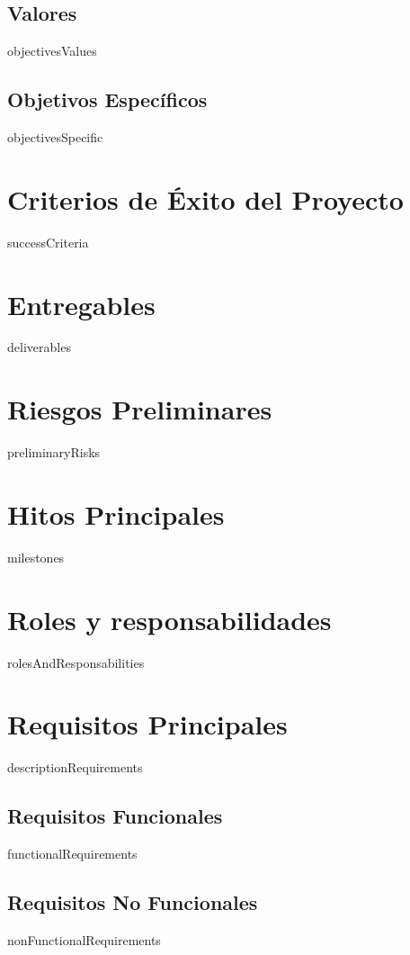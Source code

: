 \documentclass[12pt]{article}
\begin{document}
\subsection{Valores}
{{objectivesValues}}
\subsection{Objetivos Específicos}
{{objectivesSpecific}}

\section{Criterios de Éxito del Proyecto}
{{successCriteria}}

\section{Entregables}
{{deliverables}}

\section{Riesgos Preliminares}
{{preliminaryRisks}}

\section{Hitos Principales}
{{milestones}}

\section{Roles y responsabilidades}
{{rolesAndResponsabilities}}

\section{Requisitos Principales}
{{descriptionRequirements}}
\subsection{Requisitos Funcionales}
{{functionalRequirements}}
\subsection{Requisitos No Funcionales}
{{nonFunctionalRequirements}}
\end{document}
